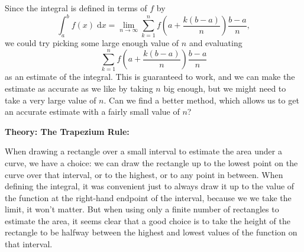 \documentclass{article}
\newcommand{\diff}{\;\mathrm{d}}
\begin{document}
Since the integral is defined in terms of $f$ by
\[\int_a^b f(x)\diff x = \lim_{n\to \infty} \sum_{k=1}^n f\left(a+\frac{k(b-a)}{n}\right)\frac{b-a}{n},\]
we could try picking some large enough value of $n$ and evaluating
\[\sum_{k=1}^n f\left(a+\frac{k(b-a)}{n}\right)\frac{b-a}{n}\]
as an estimate of the integral. This is guaranteed to work, and we can make the estimate as accurate as we like by taking $n$ big enough, but we might need to take a very large value of $n$. Can we find a better method, which allows us to get an accurate estimate with a fairly small value of $n$?



\begin{center}
\end{center}




\clearpage










\textbf{Theory: The Trapezium Rule:}

\bigskip

When drawing a rectangle over a small interval to estimate the area under a curve, we have a choice: we can draw the rectangle up to the lowest point on the curve over that interval, or to the highest, or to any point in between. When defining the integral, it was convenient just to always draw it up to the value of the function at the right-hand endpoint of the interval, because we we take the limit, it won't matter. But when using only a finite number of rectangles to estimate the area, it seems clear that a good choice is to take the height of the rectangle to be halfway between the highest and lowest values of the function on that interval.
\end{document}

